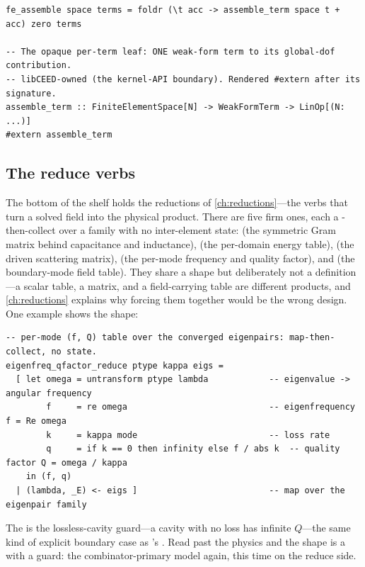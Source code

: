 \begin{lstlisting}[style=l4style]
fe_assemble space terms = foldr (\t acc -> assemble_term space t + acc) zero terms

-- The opaque per-term leaf: ONE weak-form term to its global-dof contribution.
-- libCEED-owned (the kernel-API boundary). Rendered #extern after its signature.
assemble_term :: FiniteElementSpace[N] -> WeakFormTerm -> LinOp[(N: ...)]
#extern assemble_term
\end{lstlisting}

\subsection{The reduce verbs}

The bottom of the shelf holds the reductions of \cref{ch:reductions}---the verbs
that turn a solved field into the physical product. There are five firm ones, each
a -then-collect over a family with no inter-element state:
 (the symmetric Gram matrix behind capacitance and inductance),
 (the per-domain energy table), 
(the driven scattering matrix),  (the per-mode
frequency and quality factor), and  (the boundary-mode
field table). They share a shape but deliberately not a definition---a scalar table,
a matrix, and a field-carrying table are different products, and \cref{ch:reductions}
explains why forcing them together would be the wrong design. One example shows the
shape:

\begin{lstlisting}[style=l4style]
-- per-mode (f, Q) table over the converged eigenpairs: map-then-collect, no state.
eigenfreq_qfactor_reduce ptype kappa eigs =
  [ let omega = untransform ptype lambda            -- eigenvalue -> angular frequency
        f     = re omega                            -- eigenfrequency f = Re omega
        k     = kappa mode                          -- loss rate
        q     = if k == 0 then infinity else f / abs k  -- quality factor Q = omega / kappa
    in (f, q)
  | (lambda, _E) <- eigs ]                          -- map over the eigenpair family
\end{lstlisting}
The  is the lossless-cavity guard---a cavity with no
loss has infinite $Q$---the same kind of explicit boundary case as 's
. Read past the physics and the shape is a  with a guard: the
combinator-primary model again, this time on the reduce side.

